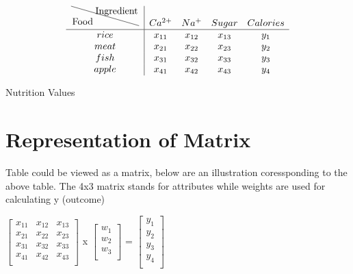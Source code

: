 \documentclass{article}
\begin{document}
\begin{table}
\[\begin{array}{c|ccccc}
\tikz{\node[below left, inner sep=1pt] (food) {Food};%
      \node[above right,inner sep=1pt] (ingredient) {Ingredient};%
      \draw (food.north west|-ingredient.north west) -- (food.south east-|ingredient.south east);}
 & Ca^{2+} & Na^{+} & Sugar & Calories \\
\hline
    rice & x_{11} & x_{12} & x_{13} & y_{1} \\
    meat & x_{21} & x_{22} & x_{23} & y_{2} \\
    fish & x_{31} & x_{32} & x_{33} & y_{3} \\
    apple & x_{41} & x_{42} & x_{43} & y_{4} \\
\end{array}\]
\caption{Nutrition Values}
\end{table}

\section{Representation of Matrix}
Table could be viewed as a matrix, below are an illustration coressponding to the above table. The 4x3 matrix stands for attributes while weights are used for calculating y (outcome)
\begin{center}
    $\begin{bmatrix}
        x_{11} & x_{12} & x_{13} \\
        x_{21} & x_{22} & x_{23} \\
        x_{31} & x_{32} & x_{33} \\
        x_{41} & x_{42} & x_{43} \\
    \end{bmatrix}$
    x 
    $\begin{bmatrix} 
        w_{1} \\ 
        w_{2} \\
        w_{3} \\
    \end{bmatrix}$
    =
    $\begin{bmatrix} 
        y_{1} \\ 
        y_{2} \\
        y_{3} \\
        y_{4} \\
    \end{bmatrix}$ \\
\end{center}
\end{document}
